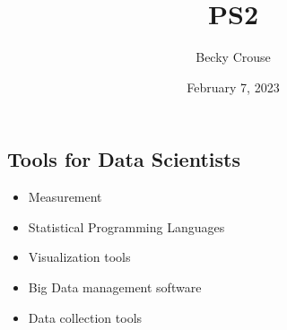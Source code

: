 \documentclass[nobib]{MSword}
\title{PS2}
\author{Becky Crouse}
\date{February 7, 2023}
\begin{document}
\maketitle

\subsection*{Tools for Data Scientists}
\begin{itemize}
  \item Measurement
  \item Statistical Programming Languages
  \item Visualization tools
  \item Big Data management software
  \item Data collection tools
\end{itemize}
\end{document}
